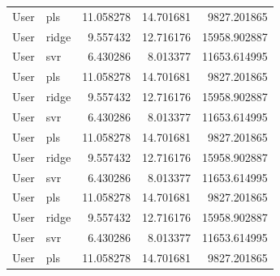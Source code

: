 \begin{tabular}{llrrr}
User & pls & 11.058278 & 14.701681 & 9827.201865 \\
User & ridge & 9.557432 & 12.716176 & 15958.902887 \\
User & svr & 6.430286 & 8.013377 & 11653.614995 \\
User & pls & 11.058278 & 14.701681 & 9827.201865 \\
User & ridge & 9.557432 & 12.716176 & 15958.902887 \\
User & svr & 6.430286 & 8.013377 & 11653.614995 \\
User & pls & 11.058278 & 14.701681 & 9827.201865 \\
User & ridge & 9.557432 & 12.716176 & 15958.902887 \\
User & svr & 6.430286 & 8.013377 & 11653.614995 \\
User & pls & 11.058278 & 14.701681 & 9827.201865 \\
User & ridge & 9.557432 & 12.716176 & 15958.902887 \\
User & svr & 6.430286 & 8.013377 & 11653.614995 \\
User & pls & 11.058278 & 14.701681 & 9827.201865 \\
\bottomrule
\end{tabular}
